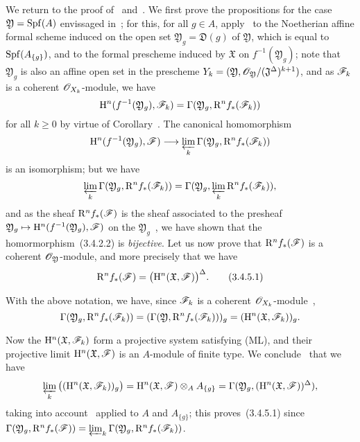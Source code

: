 \begin{env}[3.4.5]
\label{III.3.4.5}
We return to the proof of~ and~.
We first prove the propositions for the case $\mathfrak{Y}=\operatorname{Spf}(A)$ envissaged in~; for this, for all $g\in A$, apply~ to the Noetherian affine formal scheme induced on the open set $\mathfrak{Y}_g=\mathfrak{D}(g)$ of $\mathfrak{Y}$, which is equal to $\operatorname{Spf}(A_{\{g\}})$, and to the formal prescheme induced by $\mathfrak{X}$ on $f^{-1}(\mathfrak{Y}_g)$; note that $\mathfrak{Y}_g$ is also an affine open set in the prescheme $Y_k=(\mathfrak{Y},\mathscr{O}_\mathfrak{Y}/(\mathfrak{J}^\Delta)^{k+1})$, and as $\mathscr{F}_k$ is a coherent $\mathscr{O}_{X_k}$-module, we have
\[
  \mathrm{H}^n(f^{-1}(\mathfrak{Y}_g),\mathscr{F}_k)=\Gamma(\mathfrak{Y}_g,\mathrm{R}^n f_*(\mathscr{F}_k))
\]
for all $k\geq 0$ by virtue of Corollary~.
The canonical homomorphism
\[
  \HH^n(f^{-1}(\mathfrak{Y}_g),\sh{F})\to\varprojlim_k\Gamma(\mathfrak{Y}_g,\RR^n f_*(\sh{F}_k))
\]
is an isomorphism; but we have~
\[
  \varprojlim_k\Gamma(\mathfrak{Y}_g,\mathrm{R}^n f_*(\mathscr{F}_k))=\Gamma(\mathfrak{Y}_g,\varprojlim_k\mathrm{R}^n f_*(\mathscr{F}_k)),
\]
and as the sheaf $\mathrm{R}^n f_*(\mathscr{F})$ is the sheaf associated to the presheaf $\mathfrak{Y}_g\mapsto\HH^n(f^{-1}(\mathfrak{Y}_g),\sh{F})$ on the $\mathfrak{Y}_g$~, we have shown that the homormorphism~(3.4.2.2) is \emph{bijective}.
Let us now prove that $\mathrm{R}^n f_*(\mathscr{F})$ is a coherent $\mathscr{O}_\mathfrak{Y}$-module, and more precisely that we have
\[
\label{III.3.4.5.1}
  \mathrm{R}^n f_*(\mathscr{F})=\big(\mathrm{H}^n(\mathfrak{X},\mathscr{F})\big)^\Delta.
  \tag{3.4.5.1}
\]

With the above notation, we have, since $\mathscr{F}_k$ is a coherent $\mathscr{O}_{X_k}$-module~,
\[
  \Gamma(\mathfrak{Y}_g,\mathrm{R}^n f_*(\mathscr{F}_k))=(\Gamma(\mathfrak{Y},\mathrm{R}^n f_*(\mathscr{F}_k)))_g=(\mathrm{H}^n(\mathfrak{X},\mathscr{F}_k))_g.
\]

Now the $\mathrm{H}^n(\mathfrak{X},\mathscr{F}_k)$ form a projective system satisfying (ML), and their projective limit $\mathrm{H}^n(\mathfrak{X},\mathscr{F})$ is an $A$-module of finite type.
We conclude~ that we have
\[
  \varprojlim_k\big((\mathrm{H}^n(\mathfrak{X},\mathscr{F}_k))_g\big)=\mathrm{H}^n(\mathfrak{X},\mathscr{F})\otimes_A A_{\{g\}}=\Gamma(\mathfrak{Y}_g,(\mathrm{H}^n(\mathfrak{X},\mathscr{F}))^\Delta),
\]
taking into account~ applied to $A$ and $A_{\{g\}}$; this proves~(3.4.5.1) since $\Gamma(\mathfrak{Y}_g,\mathrm{R}^n f_*(\mathscr{F}))=\varprojlim_k\Gamma(\mathfrak{Y}_g,\mathrm{R}^n f_*(\mathscr{F}_k))$.


\end{env}
